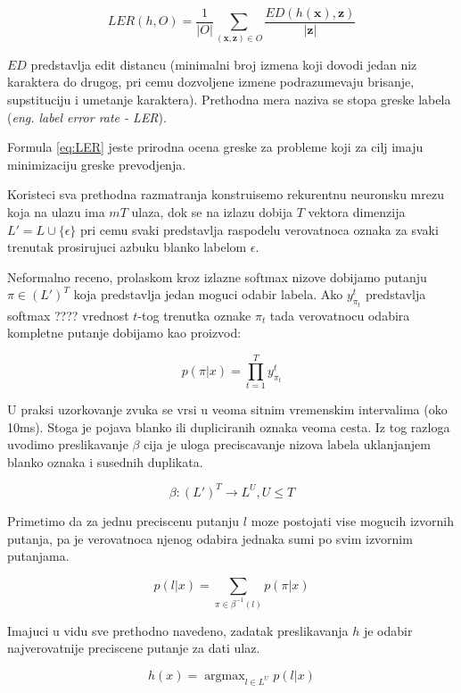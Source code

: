 \documentclass[a4paper]{article}
\DeclareMathOperator*{\argmax}{argmax}
\begin{document}
\begin{equation}
\label{eq:LER}
LER(h, O) = \frac{1}{|O|}\sum_{(\textbf{x}, \textbf{z}) \in O}\frac{ED(h(\textbf{x}), \textbf{z})}{\textbf{|z|}}
\end{equation}


$ED$ predstavlja edit distancu (minimalni broj izmena koji dovodi jedan niz karaktera do drugog, pri cemu dozvoljene izmene podrazumevaju brisanje,  supstituciju i umetanje karaktera).  Prethodna mera naziva se stopa greske labela (\textit{eng.  label error rate - LER}).  


Formula \ref{eq:LER} jeste prirodna ocena greske za probleme koji za cilj imaju minimizaciju greske prevodjenja.

\bigskip
Koristeci sva prethodna razmatranja konstruisemo rekurentnu neuronsku mrezu koja na ulazu ima $mT$ ulaza,  dok se na izlazu dobija $T$ vektora dimenzija $L' = L \cup \{\epsilon\}$ pri cemu svaki predstavlja raspodelu verovatnoca oznaka za svaki trenutak prosirujuci azbuku blanko labelom $\epsilon$.

\bigskip
Neformalno receno,  prolaskom kroz izlazne softmax nizove dobijamo putanju $\pi \in (L')^T$ koja predstavlja jedan moguci odabir labela.  Ako $y_{\pi_t}^t$ predstavlja softmax ???? vrednost $t$-tog trenutka oznake $\pi_t$ tada verovatnocu odabira kompletne putanje dobijamo kao proizvod:

$$p(\pi|x) = \prod_{t=1}^Ty_{\pi_t}^t$$

U praksi uzorkovanje zvuka se vrsi u veoma sitnim vremenskim intervalima (oko 10ms). Stoga je pojava blanko ili dupliciranih oznaka veoma cesta.  Iz tog razloga uvodimo preslikavanje $\beta$ cija je uloga preciscavanje nizova labela uklanjanjem blanko oznaka i susednih duplikata.  

$$\beta : (L')^T \rightarrow L^U,  U \leq T$$

Primetimo da za jednu preciscenu putanju $l$ moze postojati vise mogucih izvornih putanja,  pa je verovatnoca njenog odabira jednaka sumi po svim izvornim putanjama.

\begin{equation}
\label{eq:beta}
p(l | x) = \sum_{\pi \in \beta^{-1}(l)} p(\pi | x)
\end{equation}

Imajuci u vidu sve prethodno navedeno,  zadatak preslikavanja $h$ je odabir najverovatnije preciscene putanje za dati ulaz.

\begin{equation}
\label{eq:h_x}
h(x) = \argmax_{l \in L^U} p(l | x)
\end{equation}
\end{document}
